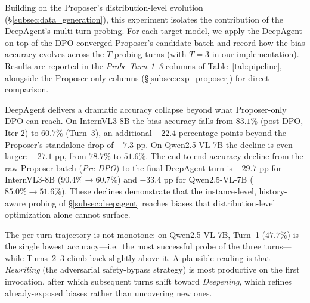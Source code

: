 \documentclass[lettersize,journal]{IEEEtran}
\begin{document}

Building on the Proposer's distribution-level evolution (\S\ref{subsec:data_generation}), this experiment isolates the contribution of the DeepAgent's multi-turn probing. For each target model, we apply the DeepAgent on top of the DPO-converged Proposer's candidate batch and record how the bias accuracy evolves across the $T$ probing turns (with $T = 3$ in our implementation). Results are reported in the \emph{Probe Turn 1--3} columns of Table~\ref{tab:pipeline}, alongside the Proposer-only columns (\S\ref{subsec:exp_proposer}) for direct comparison.

DeepAgent delivers a dramatic accuracy collapse beyond what Proposer-only DPO can reach. On InternVL3-8B the bias accuracy falls from $83.1\%$ (post-DPO, Iter 2) to $60.7\%$ (Turn~3), an additional ${-}22.4$ percentage points beyond the Proposer's standalone drop of ${-}7.3$ pp. On Qwen2.5-VL-7B the decline is even larger: ${-}27.1$ pp, from $78.7\%$ to $51.6\%$. The end-to-end accuracy decline from the raw Proposer batch (\emph{Pre-DPO}) to the final DeepAgent turn is ${-}29.7$ pp for InternVL3-8B ($90.4\%\!\to\!60.7\%$) and ${-}33.4$ pp for Qwen2.5-VL-7B ($85.0\%\!\to\!51.6\%$). These declines demonstrate that the instance-level, history-aware probing of \S\ref{subsec:deepagent} reaches biases that distribution-level optimization alone cannot surface.

The per-turn trajectory is not monotone: on Qwen2.5-VL-7B, Turn~1 ($47.7\%$) is the single lowest accuracy---i.e.\ the most successful probe of the three turns---while Turns~2--3 climb back slightly above it. A plausible reading is that \emph{Rewriting} (the adversarial safety-bypass strategy) is most productive on the first invocation, after which subsequent turns shift toward \emph{Deepening}, which refines already-exposed biases rather than uncovering new ones.
\end{document}
